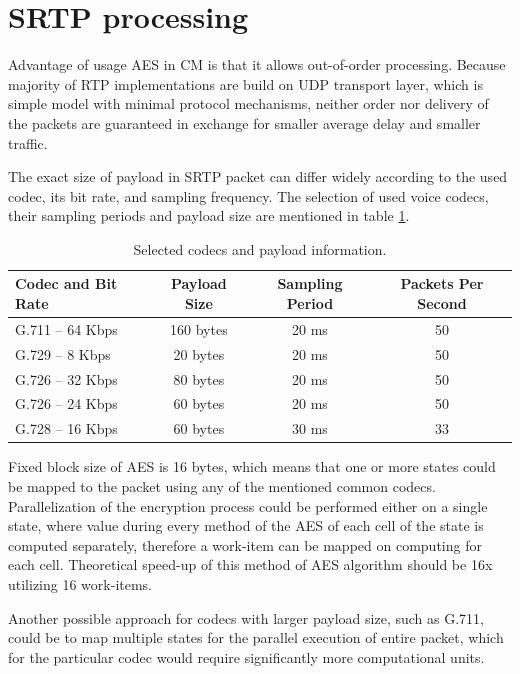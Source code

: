 \section{SRTP processing}
Advantage of usage AES in CM is that it allows out-of-order processing. Because
majority of RTP implementations are build on UDP transport layer, which is 
simple model with minimal protocol mechanisms, neither order nor delivery of the
packets are guaranteed in exchange for smaller average delay and smaller 
traffic. 

The exact size of payload in SRTP packet can differ widely according to the 
used codec, its bit rate, and sampling frequency. The selection of used voice
codecs, their sampling periods and payload size are mentioned in table 
\ref{bandwidth}.

\begin{table}[H]
\begin{center}
\begin{tabular}{|l|ccc|}\hline%
  Codec and Bit Rate & Payload Size & Sampling Period & Packets Per Second\\\hline
  G.711 -- 64 Kbps   & 160 bytes    & 20 ms           & 50 \\
  G.729 -- 8 Kbps    & 20 bytes     & 20 ms           & 50 \\
  G.726 -- 32 Kbps   & 80 bytes     & 20 ms           & 50 \\
  G.726 -- 24 Kbps   & 60 bytes     & 20 ms           & 50 \\
  G.728 -- 16 Kbps   & 60 bytes     & 30 ms           & 33 \\
 \hline
\end{tabular}
\end{center}
\caption{Selected codecs and payload information.} %
\label{bandwidth}
\end{table}

Fixed block size of AES is 16 bytes, which means that one or more states could
be mapped to the packet using any of the mentioned common codecs. Parallelization
of the encryption process could be performed either on a single state, where
value during every method of the AES of each cell of the state is computed 
separately, therefore a work-item can be mapped on computing for each cell. 
Theoretical speed-up of this method of AES algorithm should be 16x utilizing 16
work-items.

Another possible approach for codecs with larger payload size, such as G.711, 
could be to map multiple states for the parallel execution of entire packet, 
which for the particular codec would require significantly more computational 
units. 


